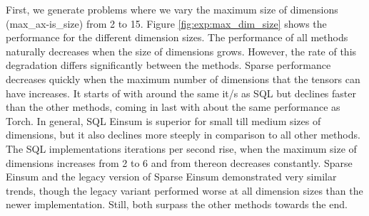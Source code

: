 \noindent
First, we generate problems where we vary the maximum size of dimensions (max\_ax-is\_size)
from 2 to 15. Figure \ref{fig:exp:max_dim_size} shows the performance for the different
dimension sizes. The performance of all methods naturally decreases when the size of dimensions
grows. However, the rate of this degradation differs significantly between the methods.
Sparse performance decreases quickly when the maximum number of dimensions that the tensors
can have increases. It starts of with around the same it/s as SQL but declines faster than
the other methods, coming in last with about the same performance as Torch. In general,
SQL Einsum is superior for small till medium sizes of dimensions, but it also declines more
steeply in comparison to all other methods. The SQL implementations iterations per second rise,
when the maximum size of dimensions increases from 2 to 6 and from thereon decreases constantly.
Sparse Einsum and the legacy version of Sparse Einsum demonstrated very similar trends,
though the legacy variant performed worse at all dimension sizes than the newer implementation.
Still, both surpass the other methods towards the end.

